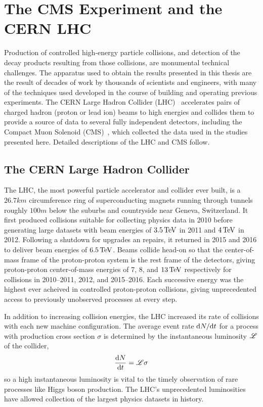 
\chapter{The CMS Experiment and the CERN LHC}
Production of controlled high-energy particle collisions, and detection of the decay products resulting from those collisions, are monumental technical challenges. The apparatus used to obtain the results presented in this thesis are the result of decades of work by thousands of scientists and engineers, with many of the techniques used developed in the course of building and operating previous experiments. The CERN Large Hadron Collider (LHC)~\cite{Evans:2008zzb,Bruning2012705} accelerates pairs of charged hadron (proton or lead ion) beams to high energies and collides them to provide a source of data to several fully independent detectors, including the Compact Muon Solenoid (CMS)~\cite{Chatrchyan:2008zzk}, which collected the data used in the studies presented here. Detailed descriptions of the LHC and CMS follow.



\section{The CERN Large Hadron Collider}
The LHC, the most powerful particle accelerator and collider ever built, is a $26.7\unit{km}$ circumference ring of superconducting magnets running through tunnels roughly $100\unit{m}$ below the suburbs and countryside near Geneva, Switzerland.
It first produced collisions suitable for collecting physics data in 2010 before generating large datasets with beam energies of $3.5\,\mathrm{Te\hspace{-.08em}V}$ in 2011 and $4\,\mathrm{Te\hspace{-.08em}V}$ in 2012.
Following a shutdown for upgrades an repairs, it returned in 2015 and 2016 to deliver beam energies of $6.5\,\mathrm{Te\hspace{-.08em}V}$.
Beams collide head-on so that the center-of-mass frame of the proton-proton system is the rest frame of the detectors, giving proton-proton center-of-mass energies of 7, 8, and $13\,\mathrm{Te\hspace{-.08em}V}$ respectively for collisions in 2010--2011, 2012, and 2015--2016.
Each successive energy was the highest ever acheived in controlled proton-proton collisions, giving unprecedented access to previously unobserved processes at every step.

In addition to increasing collision energies, the LHC increased its rate of collisions with each new machine configuration.
The average event rate $\mathrm{d} N/\mathrm{d} t$ for a process with production cross section $\sigma$ is determined by the instantaneous luminosity $\mathscr{L}$ of the collider,
\begin{equation}
  \label{eq:instLumi}
  \frac{\mathrm{d} N}{\mathrm{d} t} = \mathscr{L}\sigma
\end{equation}
so a high instantaneous luminosity is vital to the timely observation of rare processes like Higgs boson production.
The LHC's unprecedented luminosities have allowed collection of the largest physics datasets in history.

